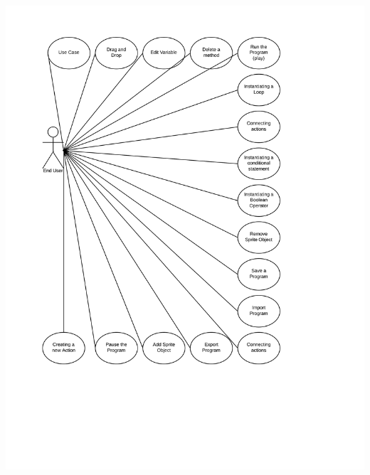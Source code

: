 \documentclass[a4paper, 10pt, oneside]{article}
\begin{document}
\begin{usecase}
\includegraphics[scale=.36]{req_uml_diag.png}
\end{usecase}
\end{document}
